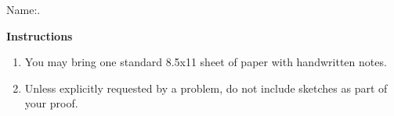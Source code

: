 \documentclass[11pt,answers]{exam}
\theoremstyle{definition}
\begin{document}
\begin{center}
\parbox{5.5in}{\centering
				Name:\enspace\hrulefill.}
\end{center}

\noindent \textbf{Instructions} 
\begin{enumerate}[label*=$\bullet$, leftmargin=*, itemsep=.1em]
\item You may bring one standard 8.5x11 sheet of paper with handwritten notes.
\item Unless explicitly requested by a problem, do not include sketches as part of your proof.
\end{enumerate}

\addpoints
\begin{center}
	\gradetable[h][questions]
\end{center}
\hrulefill
\vskip10pt
\end{document}
